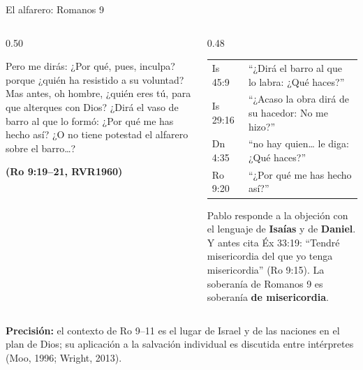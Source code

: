\documentclass[hyperref={bookmarks=false},aspectratio=169]{beamer}
\newcommand{\fuente}[1]{\par\hfill{\upshape\bfseries\footnotesize\textcolor{azul}{#1}}}
\newcommand{\destacar}[1]{\textbf{\textcolor{azul}{#1}}}
\newcommand{\precision}[1]{{\footnotesize\color{gris}\textbf{Precisión:} #1}}
\begin{document}
\begin{frame}{El alfarero: Romanos 9}
\begin{columns}[t,onlytextwidth]
\begin{column}{0.50\textwidth}
\begin{cita}Pero me dirás: ¿Por qué, pues, inculpa? porque ¿quién ha resistido a su voluntad? Mas antes, oh hombre, ¿quién eres tú, para que alterques con Dios? ¿Dirá el vaso de barro al que lo formó: ¿Por qué me has hecho así? ¿O no tiene potestad el alfarero sobre el barro\ldots?\fuente{(Ro 9:19--21, RVR1960)}\end{cita}
\end{column}
\begin{column}{0.48\textwidth}
\scriptsize\renewcommand{\arraystretch}{1.15}
\begin{tabular}{@{}>{\RaggedRight\arraybackslash}p{1.4cm}>{\RaggedRight\arraybackslash}p{4.2cm}@{}}
\toprule
Is 45:9 & ``¿Dirá el barro al que lo labra: ¿Qué haces?'' \\
Is 29:16 & ``¿Acaso la obra dirá de su hacedor: No me hizo?'' \\
Dn 4:35 & ``no hay quien\ldots{} le diga: ¿Qué haces?'' \\
Ro 9:20 & ``¿Por qué me has hecho así?'' \\
\bottomrule
\end{tabular}\par\smallskip
\small Pablo responde a la objeción con el lenguaje de \destacar{Isaías} y de \destacar{Daniel}. Y antes cita Éx 33:19: ``Tendré misericordia del que yo tenga misericordia'' (Ro 9:15). La soberanía de Romanos 9 es soberanía \destacar{de misericordia}.
\end{column}
\end{columns}\par\smallskip
\precision{el contexto de Ro 9--11 es el lugar de Israel y de las naciones en el plan de Dios; su aplicación a la salvación individual es discutida entre intérpretes (Moo, 1996; Wright, 2013).}
\end{frame}
\end{document}
